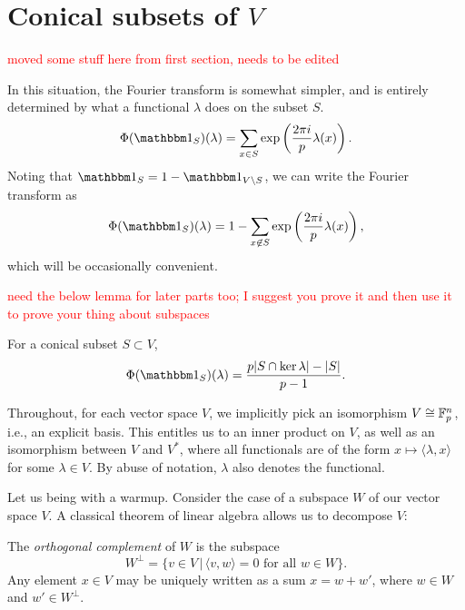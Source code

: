 \section{Conical subsets of $V$}\label{sec:part0}
\textcolor{red}{moved some stuff here from first section, needs to be edited}

In this situation, the Fourier transform is somewhat simpler, and is entirely
determined by what a functional $\lambda$ does on the subset $S$.
\[ \Phi(\IND_S)(\lambda) = \sum_{x\in S} \exp \left(\frac{2\pi i}{p} \lambda(x)\right). \]
Noting that $\IND_S = 1 - \IND_{V\setminus S}$, we can write the Fourier transform as
\[ \Phi(\IND_S)(\lambda) = 1 - \sum_{x\not\in S} \exp \left(\frac{2\pi i}{p} \lambda(x)\right), \]
which will be occasionally convenient. 

\textcolor{red}{need the below lemma for later parts too; I suggest you prove it and then use it to prove your thing about subspaces}
\begin{lem}\label{lem:FT-conical-subset}
	For a conical subset $S \subset V$,
	\[
	\Phi(\IND_S)(\lambda) = \frac{p|S \cap \ker \lambda| - |S|}{p-1}.
	\]
\end{lem}

\begin{rem}
	Throughout, for each vector space $V$, we implicitly pick an isomorphism 
	$V\cong\mathbb{F}_p^n$, i.e., an explicit basis. This
	entitles us to an inner product on $V$, as well as an isomorphism between $V$ and
	$V^*$, where all functionals are of the form $x \mapsto \langle \lambda, x \rangle$
	for some $\lambda\in V$. By abuse of notation, $\lambda$ also denotes the functional.
\end{rem}

Let us being with a warmup. Consider the case of a subspace $W$ of our vector space $V$.
A classical theorem of linear algebra allows us to decompose $V$:
\begin{prop}
    The \emph{orthogonal complement} of $W$ is the subspace    
    \[ W^\perp = \{ v \in V \,|\, \langle v, w \rangle = 0 \text{ for all } w \in W \}. \]
    Any element $x\in V$ may be uniquely written as a sum $x = w + w'$, where $w\in W$
    and $w'\in W^\perp$.
\end{prop}

